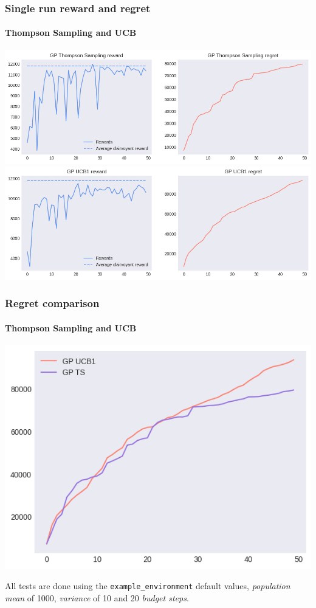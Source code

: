 \begin{frame}[plain]

\frametitle{Single run reward and regret}
\framesubtitle{Thompson Sampling and UCB}

\begin{center}
	\includegraphics[scale=0.4]{img/Graphs/uncertain_alpha_unit/image1.png}
	\includegraphics[scale=0.4]{img/Graphs/uncertain_alpha_unit/image2.png}
\end{center}

\end{frame}


\begin{frame}[plain]

\frametitle{Regret comparison}
\framesubtitle{Thompson Sampling and UCB}

\begin{center}
	\includegraphics[scale=0.5]{img/Graphs/uncertain_alpha_unit/image3.png}
\end{center}

\scriptsize All tests are done using the \texttt{example\_environment} default values, \textit{population mean} of 1000, \textit{variance} of 10 and 20 \textit{budget steps}.

\end{frame}

